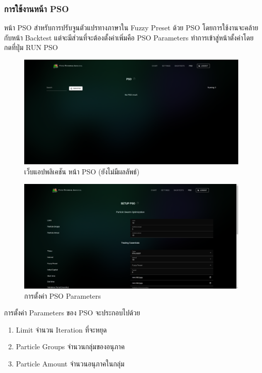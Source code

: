 \subsubsection{การใช้งานหน้า PSO}
หน้า PSO สำหรับการปรับจูนตัวแปรทางภาษาใน Fuzzy Preset ด้วย PSO โดยการใช้งานจะคล้ายกับหน้า Backtest แต่จะมีส่วนที่จะต้องตั้งค่าเพิ่มคือ PSO Parameters ทำการเข้าสู่หน้าตั้งค่าโดยกดที่ปุ่ม RUN PSO
\begin{figure}[ht]
    \centering
    \includegraphics[width=\textwidth]{images/web-tuts/pso-no-result.PNG}
    \caption{เว็บแอปพลิเคชัน หน้า PSO (ยังไม่มีผลลัพธ์)}
    \label{fig:pso-no-result}
\end{figure}
\FloatBarrier
\begin{figure}[ht]
    \centering
    \includegraphics[width=\textwidth]{images/web-tuts/pso-setup-params.PNG}
    \caption{การตั้งค่า PSO Parameters}
    \label{fig:pso-setup-params}
\end{figure}
\FloatBarrier
การตั้งค่า Parameters ของ PSO จะประกอบไปด้วย
\begin{enumerate}
    \overfullrule=0pt
    \item Limit จำนวน Iteration ที่จะหยุด
    \item Particle Groups จำนวนกลุ่มของอนุภาค
    \item Particle Amount จำนวนอนุภาคในกลุ่ม
\end{enumerate}
